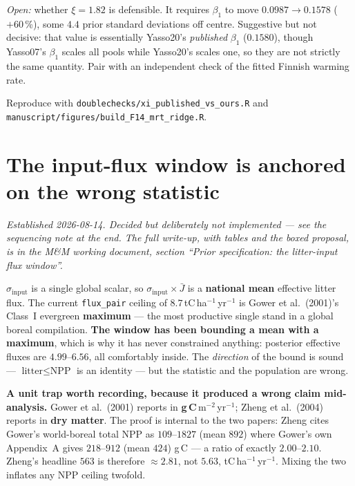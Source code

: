 \documentclass[11pt]{article}
\newcommand{\sinput}{\sigma_{\mathrm{input}}}
\begin{document}
\emph{Open:} whether $\xi=1.82$ is defensible. It requires $\beta_1$ to move $0.0987\rightarrow0.1578$
($+60$\,\%), some $4.4$ prior standard deviations off centre. Suggestive but not decisive: that value
is essentially Yasso20's \emph{published} $\beta_1$ ($0.1580$), though Yasso07's $\beta_1$ scales all
pools while Yasso20's scales one, so they are not strictly the same quantity. Pair with an
independent check of the fitted Finnish warming rate.

\smallskip
\noindent Reproduce with \texttt{doublechecks/xi\_published\_vs\_ours.R} and
\texttt{manuscript/figures/build\_F14\_mrt\_ridge.R}.

\section{The input-flux window is anchored on the wrong statistic}\label{sec:fluxwindow}

\emph{Established 2026-08-14. Decided but deliberately not implemented --- see the sequencing note
at the end. The full write-up, with tables and the boxed proposal, is in the M\&M working document,
section ``Prior specification: the litter-input flux window''.}

$\sinput$ is a single global scalar, so $\sinput \times \bar{J}$ is a \textbf{national mean}
effective litter flux. The current \texttt{flux\_pair} ceiling of $8.7$\,tC\,ha$^{-1}$\,yr$^{-1}$ is
Gower et al.\ (2001)'s Class~I evergreen \textbf{maximum} --- the most productive single stand in a
global boreal compilation. \textbf{The window has been bounding a mean with a maximum}, which is why
it has never constrained anything: posterior effective fluxes are $4.99$--$6.56$, all comfortably
inside. The \emph{direction} of the bound is sound --- $\text{litter}\le\text{NPP}$ is an identity
--- but the statistic and the population are wrong.

\begin{caveat}
\textbf{A unit trap worth recording, because it produced a wrong claim mid-analysis.} Gower et al.\
(2001) reports in \textbf{g\,C}\,m$^{-2}$\,yr$^{-1}$; Zheng et al.\ (2004) reports in \textbf{dry
matter}. The proof is internal to the two papers: Zheng cites Gower's world-boreal total NPP as
$109$--$1827$ (mean $892$) where Gower's own Appendix~A gives $218$--$912$ (mean $424$) g\,C --- a
ratio of exactly $2.00$--$2.10$. Zheng's headline $563$ is therefore $\approx 2.81$, not $5.63$,
tC\,ha$^{-1}$\,yr$^{-1}$. Mixing the two inflates any NPP ceiling twofold.
\end{caveat}
\end{document}
